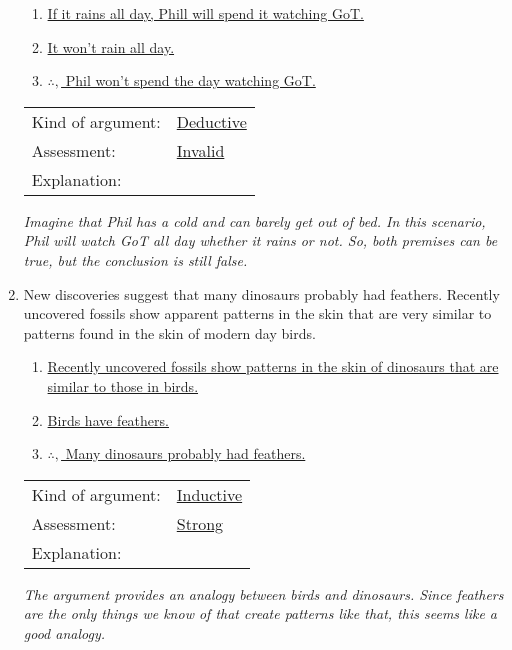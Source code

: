 \documentclass[10pt]{article}
\begin{document}
\begin{enumerate}
  \begin{enumerate}[1.]
    \item \underline{If it rains all day, Phill will spend it watching GoT.}
    \item \underline{It won't rain all day.}
    \item \underline{$\therefore,$ Phil won't spend the day watching GoT.}
  \end{enumerate}
  
  \begin{tabular}{ll}
    Kind of argument: & \underline{Deductive} \\
    Assessment: & \underline{Invalid} \\
    Explanation: &  \\
  \end{tabular}
  
  \textit{Imagine that Phil has a cold and can barely get out of bed.  In this scenario, Phil will watch GoT all day whether it rains or not.  So, both premises can be true, but the conclusion is still false.}

\vspace{.9in}

  \item New discoveries suggest that many dinosaurs probably had feathers.  Recently uncovered fossils show apparent patterns in the skin that are very similar to patterns found in the skin of modern day birds.
  
    \begin{enumerate}[1.]
    \item \underline{Recently uncovered fossils show patterns in the skin of dinosaurs that are similar to those in birds.}
    \item \underline{Birds have feathers.}
    \item \underline{$\therefore,$ Many dinosaurs probably had feathers.}
  \end{enumerate}
  
  \begin{tabular}{ll}
    Kind of argument: & \underline{Inductive} \\
    Assessment: & \underline{Strong} \\
    Explanation: &  \\
  \end{tabular}
  
  \textit{The argument provides an analogy between birds and dinosaurs.  Since feathers are the only things we know of that create patterns like that, this seems like a good analogy.}


\end{enumerate}
\end{document}
